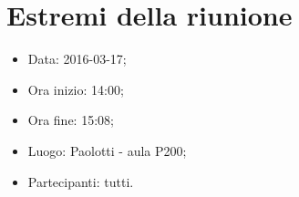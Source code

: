 \documentclass[../RiunioneInterna16-02-19.tex]{subfiles}
\begin{document}
\section{Estremi della riunione}
	\begin{itemize}
		\item Data: 2016-03-17;
		\item Ora inizio: 14:00;
		\item Ora fine: 15:08;
		\item Luogo: Paolotti - aula P200;
		\item Partecipanti: tutti.
	\end{itemize}
\end{document}
